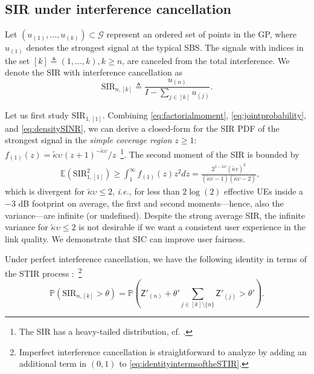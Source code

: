 \documentclass[lettersize,journal]{IEEEtran}
\begin{document}
\subsection{SIR under interference cancellation}



Let $(u_{(1)}, \dots, u_{(k)}) \subset \mathcal{G}$ represent an ordered set of points in the GP, where $u_{(1)}$ denotes the strongest signal at the typical SBS. The signals with indices in the set $[k] \triangleq (1,\dots,k), k\geq n$, are canceled from the total interference. We denote the SIR with interference cancellation as
\begin{equation}
  \label{eq:IC-SINR}
  \text{SIR}_{n,[k]} \triangleq \frac{u_{(n)}}{I-\sum_{j \in [k]} u_{(j)}}.
\end{equation}


Let us first study $\text{SIR}_{1,[1]}$. Combining \eqref{eq:factorialmoment}, \eqref{eq:jointprobability}, and \eqref{eq:densitySINR}, we can derive a closed-form for the SIR PDF of the strongest signal in the \textit{simple coverage region} $z\geq 1$: $f_{(1)}(z) =  {\tilde{\kappa}\upsilon_{}\left({z + 1} \right)^{-\tilde{\kappa}\upsilon_{}}}/{z}$~\footnote{The SIR has a heavy-tailed distribution, cf. \cite[Eq. 32]{10909705}.}. The second moment of the SIR is bounded by
\begin{align}
  \label{eq:SIR2}
&\mathbb{E}(\text{SIR}^2_{1,[1]}) \geq \int_{1}^{\infty}f_{(1)}(z) z^2 dz = \frac{2^{1-\tilde{\kappa}v}(\tilde{\kappa}v)^2}{(\tilde{\kappa}\upsilon-1)(\tilde{\kappa}\upsilon-2)},
\end{align}
which is divergent for $\tilde{\kappa}\upsilon \leq 2$, \textit{i.e.}, for less than $2\log(2)$ effective UEs inside a $-3$ dB footprint on average, the first and second moments---hence, also the variance---are infinite (or undefined). Despite the strong average SIR, the infinite variance for $\tilde{\kappa}\upsilon \leq 2$ is not desirable if we want a consistent user experience in the link quality. We demonstrate that SIC can improve user fairness.


Under perfect interference cancellation, we have the following identity in terms of the STIR process \cite[Eq. 69]{7305791}:~\footnote{Imperfect interference cancellation is straightforward to analyze by adding an additional term in $(0,1)$ \cite[Eq. 6.21]{alma998193414406526} to \eqref{eq:identityintermsoftheSTIR}.}
\begin{equation}
  \label{eq:identityintermsoftheSTIR}
   \mathbb{P}(\text{SIR}_{n,[k]} > \theta) = \mathbb{P}\left(\mathsf{Z}'_{(n)}+\theta'\sum_{j\in [k] \setminus \{n\}}\mathsf{Z}'_{(j)} > \theta'\right).
\end{equation}
\end{document}
